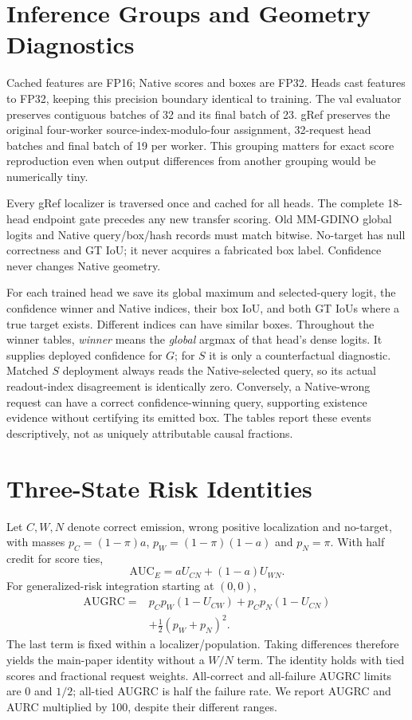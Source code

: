 \documentclass[10pt,twocolumn,letterpaper]{article}
\begin{document}
\section{Inference Groups and Geometry Diagnostics}
Cached features are FP16; Native scores and boxes are FP32. Heads cast
features to FP32, keeping this precision boundary identical to training.
The val evaluator preserves contiguous batches of 32 and its final batch
of 23. gRef preserves the original four-worker source-index-modulo-four
assignment, 32-request head batches and final batch of 19 per worker.
This grouping matters for exact score reproduction even when output
differences from another grouping would be numerically tiny.

Every gRef localizer is traversed once and cached for all heads.
The complete 18-head endpoint gate precedes any new transfer scoring.
Old MM-GDINO global logits and Native query/box/hash records must match
bitwise. No-target has null correctness and GT IoU; it never acquires
a fabricated box label. Confidence never changes Native geometry.

For each trained head we save its global maximum and selected-query logit,
the confidence winner and Native indices, their box IoU, and both GT IoUs
where a true target exists. Different indices can have similar boxes.
Throughout the winner tables, \emph{winner} means the \emph{global}
argmax of that head's dense logits. It supplies deployed confidence
for $G$; for $S$ it is only a counterfactual diagnostic.
Matched $S$ deployment always reads the Native-selected query, so
its actual readout-index disagreement is identically zero.
Conversely, a Native-wrong request can have a correct confidence-winning
query, supporting existence evidence without certifying its emitted box.
The tables report these events descriptively, not as uniquely attributable
causal fractions.

\section{Three-State Risk Identities}
Let $C,W,N$ denote correct emission, wrong positive localization and
no-target, with masses
$p_C=(1-\pi)a$, $p_W=(1-\pi)(1-a)$ and $p_N=\pi$.
With half credit for score ties,
\begin{equation}
\mathrm{AUC}_E=aU_{CN}+(1-a)U_{WN}.
\end{equation}
For generalized-risk integration starting at $(0,0)$,
\begin{align}
\mathrm{AUGRC}
={}&p_Cp_W(1-U_{CW})+p_Cp_N(1-U_{CN})\nonumber\\
&+\tfrac12(p_W+p_N)^2.
\end{align}
The last term is fixed within a localizer/population. Taking differences
therefore yields the main-paper identity without a $W/N$ term.
The identity holds with tied scores and fractional request weights.
All-correct and all-failure AUGRC limits are 0 and $1/2$; all-tied
AUGRC is half the failure rate. We report AUGRC and AURC multiplied
by 100, despite their different ranges.
\end{document}

